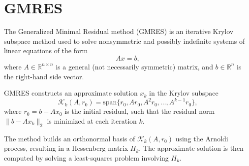 \documentclass[hidelinks]{article}
\begin{document}
\section{GMRES}

The Generalized Minimal Residual method (GMRES) is an iterative Krylov subspace method used to solve nonsymmetric and possibly indefinite systems of linear equations of the form
\[
Ax = b,
\]
where \( A \in \mathbb{R}^{n \times n} \) is a general (not necessarily symmetric) matrix, and \( b \in \mathbb{R}^n \) is the right-hand side vector.

\noindent GMRES constructs an approximate solution \( x_k \) in the Krylov subspace
\[
\mathcal{K}_k(A, r_0) = \text{span} \{ r_0, Ar_0, A^2r_0, \dots, A^{k-1}r_0 \},
\]
where \( r_0 = b - Ax_0 \) is the initial residual, such that the residual norm \( \| b - Ax_k \|_2 \) is minimized at each iteration \( k \).

\noindent The method builds an orthonormal basis of \( \mathcal{K}_k(A, r_0) \) using the Arnoldi process, resulting in a Hessenberg matrix \( H_k \). The approximate solution is then computed by solving a least-squares problem involving \( H_k \).



\end{document}
